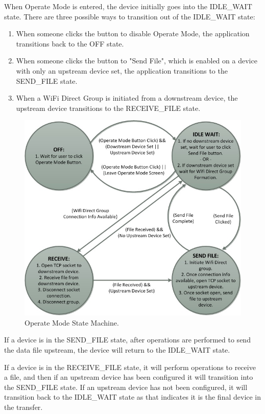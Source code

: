 \documentclass[10pt,twocolumn]{article}
\begin{document}
When Operate Mode is entered, the device initially goes into the IDLE\_WAIT state.
There are three possible ways to transition out of the IDLE\_WAIT state:
\begin{enumerate}
  \item When someone clicks the button to disable Operate Mode, the application transitions back to the OFF state.
  \item When someone clicks the button to "Send File", which is enabled on a device with only an upstream device set, the application transitions to the SEND\_FILE state.
  \item When a WiFi Direct Group is initiated from a downstream device, the upstream device transitions to the RECEIVE\_FILE state.
\end{enumerate}
\begin{figure}
\includegraphics[width=\columnwidth]{statemachine}
\caption{Operate Mode State Machine.}
\end{figure}
If a device is in the SEND\_FILE state, after operations are performed to send the data file upstream, the device will return to the IDLE\_WAIT state.

If a device is in the RECEIVE\_FILE state, it will perform operations to receive a file, and then if an upstream device has been configured it will transition into the SEND\_FILE state.
If an upstream device has not been configured, it will transition back to the IDLE\_WAIT state as that indicates it is the final device in the transfer.
\end{document}
